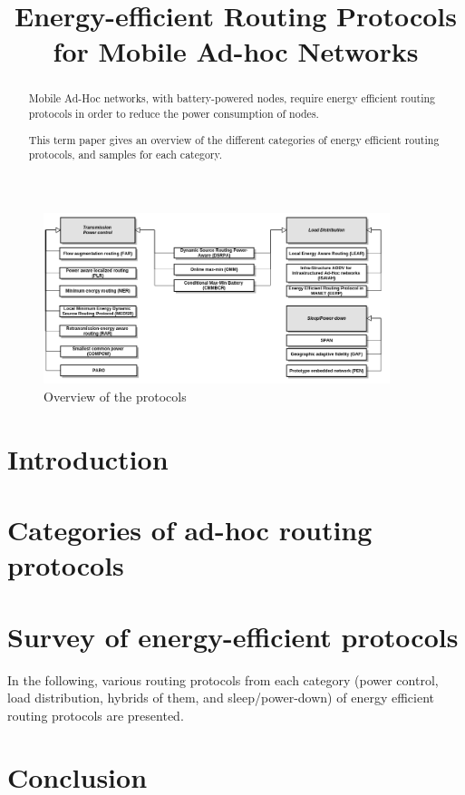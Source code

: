 \documentclass[conference]{IEEEtran}
\begin{document}
\title{Energy-efficient Routing Protocols for Mobile Ad-hoc Networks}
\author{
}

\maketitle



\begin{abstract}
Mobile Ad-Hoc networks, with battery-powered nodes, require energy efficient
routing protocols in order to reduce the power consumption of nodes.

This term paper gives an overview of the different categories of energy
efficient routing protocols, and samples for each category.
\end{abstract}
\begin{figure}
  \includegraphics[width=0.9\textwidth]{images/overview}
  \caption{Overview of the protocols}
  \label{fig:overview}
\end{figure}

\section{Introduction}


\section{Categories of ad-hoc routing protocols}


\section{Survey of energy-efficient protocols}
In the following, various routing protocols from each category (power control,
load distribution, hybrids of them, and sleep/power-down) of energy
efficient routing protocols are presented.







\section{Conclusion}




\end{document}
